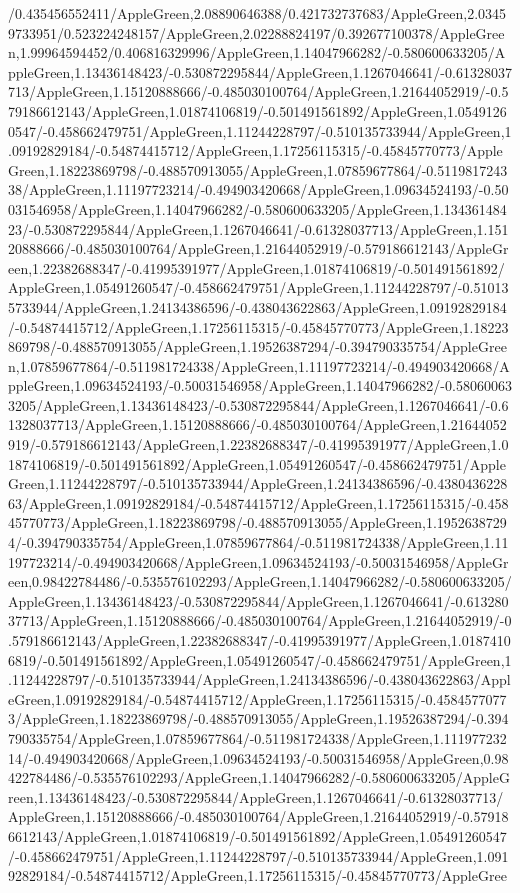 {\begin{tikzternal}
{/0.435456552411/AppleGreen,2.08890646388/0.421732737683/AppleGreen,2.03459733951/0.523224248157/AppleGreen,2.02288824197/0.392677100378/AppleGreen,1.99964594452/0.406816329996/AppleGreen,1.14047966282/-0.580600633205/AppleGreen,1.13436148423/-0.530872295844/AppleGreen,1.1267046641/-0.61328037713/AppleGreen,1.15120888666/-0.485030100764/AppleGreen,1.21644052919/-0.579186612143/AppleGreen,1.01874106819/-0.501491561892/AppleGreen,1.05491260547/-0.458662479751/AppleGreen,1.11244228797/-0.510135733944/AppleGreen,1.09192829184/-0.54874415712/AppleGreen,1.17256115315/-0.45845770773/AppleGreen,1.18223869798/-0.488570913055/AppleGreen,1.07859677864/-0.511981724338/AppleGreen,1.11197723214/-0.494903420668/AppleGreen,1.09634524193/-0.50031546958/AppleGreen,1.14047966282/-0.580600633205/AppleGreen,1.13436148423/-0.530872295844/AppleGreen,1.1267046641/-0.61328037713/AppleGreen,1.15120888666/-0.485030100764/AppleGreen,1.21644052919/-0.579186612143/AppleGreen,1.22382688347/-0.41995391977/AppleGreen,1.01874106819/-0.501491561892/AppleGreen,1.05491260547/-0.458662479751/AppleGreen,1.11244228797/-0.510135733944/AppleGreen,1.24134386596/-0.438043622863/AppleGreen,1.09192829184/-0.54874415712/AppleGreen,1.17256115315/-0.45845770773/AppleGreen,1.18223869798/-0.488570913055/AppleGreen,1.19526387294/-0.394790335754/AppleGreen,1.07859677864/-0.511981724338/AppleGreen,1.11197723214/-0.494903420668/AppleGreen,1.09634524193/-0.50031546958/AppleGreen,1.14047966282/-0.580600633205/AppleGreen,1.13436148423/-0.530872295844/AppleGreen,1.1267046641/-0.61328037713/AppleGreen,1.15120888666/-0.485030100764/AppleGreen,1.21644052919/-0.579186612143/AppleGreen,1.22382688347/-0.41995391977/AppleGreen,1.01874106819/-0.501491561892/AppleGreen,1.05491260547/-0.458662479751/AppleGreen,1.11244228797/-0.510135733944/AppleGreen,1.24134386596/-0.438043622863/AppleGreen,1.09192829184/-0.54874415712/AppleGreen,1.17256115315/-0.45845770773/AppleGreen,1.18223869798/-0.488570913055/AppleGreen,1.19526387294/-0.394790335754/AppleGreen,1.07859677864/-0.511981724338/AppleGreen,1.11197723214/-0.494903420668/AppleGreen,1.09634524193/-0.50031546958/AppleGreen,0.98422784486/-0.535576102293/AppleGreen,1.14047966282/-0.580600633205/AppleGreen,1.13436148423/-0.530872295844/AppleGreen,1.1267046641/-0.61328037713/AppleGreen,1.15120888666/-0.485030100764/AppleGreen,1.21644052919/-0.579186612143/AppleGreen,1.22382688347/-0.41995391977/AppleGreen,1.01874106819/-0.501491561892/AppleGreen,1.05491260547/-0.458662479751/AppleGreen,1.11244228797/-0.510135733944/AppleGreen,1.24134386596/-0.438043622863/AppleGreen,1.09192829184/-0.54874415712/AppleGreen,1.17256115315/-0.45845770773/AppleGreen,1.18223869798/-0.488570913055/AppleGreen,1.19526387294/-0.394790335754/AppleGreen,1.07859677864/-0.511981724338/AppleGreen,1.11197723214/-0.494903420668/AppleGreen,1.09634524193/-0.50031546958/AppleGreen,0.98422784486/-0.535576102293/AppleGreen,1.14047966282/-0.580600633205/AppleGreen,1.13436148423/-0.530872295844/AppleGreen,1.1267046641/-0.61328037713/AppleGreen,1.15120888666/-0.485030100764/AppleGreen,1.21644052919/-0.579186612143/AppleGreen,1.01874106819/-0.501491561892/AppleGreen,1.05491260547/-0.458662479751/AppleGreen,1.11244228797/-0.510135733944/AppleGreen,1.09192829184/-0.54874415712/AppleGreen,1.17256115315/-0.45845770773/AppleGree}
\end{tikzternal}}
